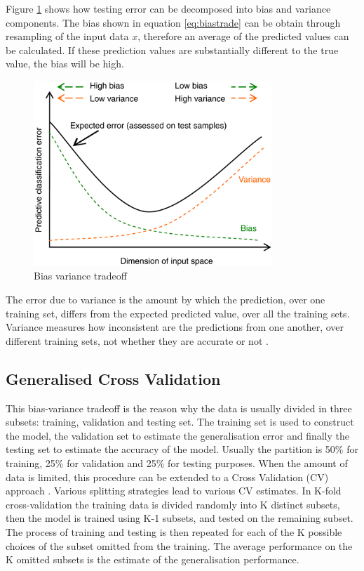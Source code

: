 Figure \ref{fig:bvtradeoff} shows how
testing error can be decomposed into bias and variance components. 
The bias shown in equation \ref{eq:biastrade} can be obtain through resampling
of the input data $x$, therefore an average of the predicted values can be
calculated. If these prediction values are substantially different to the true
value, the bias will be high.

\begin{figure}[!h]
  \centering
  \includegraphics[width=0.8\textwidth]{img/biasvariancetradeoff}
  \caption{Bias variance tradeoff}
  \label{fig:bvtradeoff}
\end{figure}

The error due to variance is the amount by which the prediction, over one
training set, differs from the expected predicted value, over all the training
sets. Variance measures how inconsistent are the predictions from one another,
over different training sets, not whether they are accurate or not
\cite{gutierrez2015machine}.

\subsection{Generalised Cross Validation}
This bias-variance tradeoff is the reason why the 
data is usually divided in three subsets: training, validation and
testing set. The training set is used to construct the model, the validation set
to estimate the generalisation error and finally the testing set to estimate
the accuracy of the model. Usually the partition is 50\% for training, 25\%
for validation and 25\% for testing purposes. When the
amount of data is limited, this procedure can be extended to
a Cross Validation (CV) approach \cite{geisser1975} . Various splitting strategies lead to various CV
estimates. In K-fold cross-validation  \cite{stone1974} the training data is divided randomly into
K distinct subsets, then the model is trained using K-1 subsets, and tested on
the remaining subset. The process of training and testing is then repeated for
each of the K possible choices of the subset omitted from the training. The
average performance on the K omitted subsets is the estimate of the
generalisation performance.

